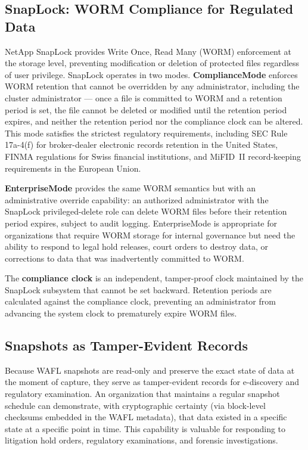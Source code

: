 \begin{securitybox}

\subsection*{SnapLock: WORM Compliance for Regulated Data}

NetApp SnapLock provides Write Once, Read Many (WORM) enforcement at the storage level, preventing modification or deletion of protected files regardless of user privilege. SnapLock operates in two modes. \textbf{ComplianceMode} enforces WORM retention that cannot be overridden by any administrator, including the cluster administrator --- once a file is committed to WORM and a retention period is set, the file cannot be deleted or modified until the retention period expires, and neither the retention period nor the compliance clock can be altered. This mode satisfies the strictest regulatory requirements, including SEC Rule 17a-4(f) for broker-dealer electronic records retention in the United States, FINMA regulations for Swiss financial institutions, and MiFID~II record-keeping requirements in the European Union.

\textbf{EnterpriseMode} provides the same WORM semantics but with an administrative override capability: an authorized administrator with the SnapLock privileged-delete role can delete WORM files before their retention period expires, subject to audit logging. EnterpriseMode is appropriate for organizations that require WORM storage for internal governance but need the ability to respond to legal hold releases, court orders to destroy data, or corrections to data that was inadvertently committed to WORM.

The \textbf{compliance clock} is an independent, tamper-proof clock maintained by the SnapLock subsystem that cannot be set backward. Retention periods are calculated against the compliance clock, preventing an administrator from advancing the system clock to prematurely expire WORM files.

\subsection*{Snapshots as Tamper-Evident Records}

Because WAFL snapshots are read-only and preserve the exact state of data at the moment of capture, they serve as tamper-evident records for e-discovery and regulatory examination. An organization that maintains a regular snapshot schedule can demonstrate, with cryptographic certainty (via block-level checksums embedded in the WAFL metadata), that data existed in a specific state at a specific point in time. This capability is valuable for responding to litigation hold orders, regulatory examinations, and forensic investigations.


\end{securitybox}
